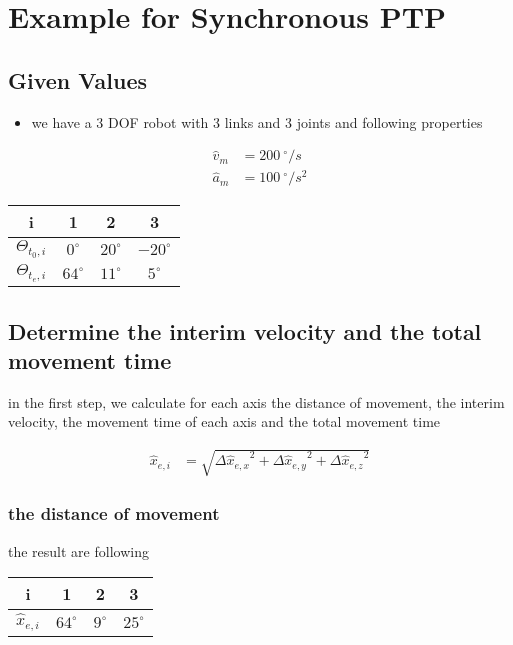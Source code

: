 \documentclass[%
  professionalfonts,%
  xcolor={%
    usenames,%
    dvipsnames,%
    svgnames,%
    table,%
    hyperref%
  }%
]{beamer}
\begin{document}
\section{Example for Synchronous PTP} 

\subsection{Given Values }
\begin{frame}
\begin{itemize}
\item we have a 3 DOF robot with 3 links and 3 joints and following properties
\end{itemize}

\begin{align*}
\hat{v}_{m} & = 200 ~^\circ/s \\
\hat{a}_{m} & = 100 ~^\circ/s^2
\end{align*}

\begin{center}
\begin{tabular}{cccc}
\toprule
i & 1 & 2 & 3 \\
\midrule
$\Theta_{t_{0},i}$ & $  0^\circ$ & $20^\circ$ & $-20^\circ$ \\ 
$\Theta_{t_{e},i}$ & $ 64^\circ$ & $11^\circ$ & $  5^\circ$ \\
\bottomrule
\end{tabular}
\end{center}
\end{frame}

\subsection{Determine the interim velocity and the total movement time}
\begin{frame}
in the first step, we calculate for each axis the distance of movement, the interim velocity, the movement time of each axis and the total movement time

\begin{align*}
\hat{x}_{e,i} & = \sqrt{{\Delta\hat{x}_{e,x}}^{2} + {\Delta\hat{x}_{e,y}}^{2} + {\Delta\hat{x}_{e,z}}^{2} }
\end{align*}

\subsubsection*{the distance of movement }
the result are following    
\begin{center}
\begin{tabular}{cccc}
\toprule
i & 1 & 2 & 3 \\
\midrule
$\hat{x}_{e,i}$ & $ 64^\circ$ & $ 9^\circ$ & $25^\circ$ \\
\bottomrule 
\end{tabular}
\end{center}
\end{frame}
\end{document}
